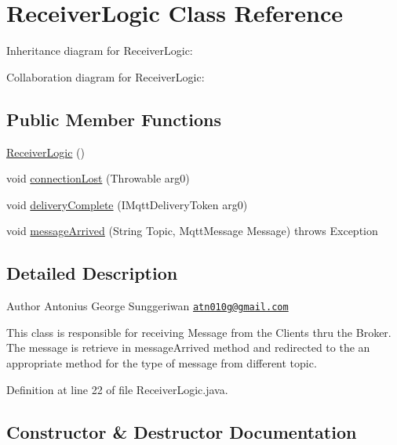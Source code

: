 \hypertarget{class_receiver_logic}{}\section{Receiver\+Logic Class Reference}
\label{class_receiver_logic}


Inheritance diagram for Receiver\+Logic\+:


Collaboration diagram for Receiver\+Logic\+:
\subsection*{Public Member Functions}
\begin{DoxyCompactItemize}
\item 
\hyperlink{class_receiver_logic_a63eb05bf9e4563a5d5b70b7754cf552a}{Receiver\+Logic} ()
\item 
void \hyperlink{class_receiver_logic_a10d83eeaf19038a5c41e2038b7dc450a}{connection\+Lost} (Throwable arg0)
\item 
void \hyperlink{class_receiver_logic_afbfe0394c17c18e33ed70e7ec8eeea84}{delivery\+Complete} (I\+Mqtt\+Delivery\+Token arg0)
\item 
void \hyperlink{class_receiver_logic_a2cfef54ab9bdcc6ddde72db5c7bdba97}{message\+Arrived} (String Topic, Mqtt\+Message Message)  throws Exception 
\end{DoxyCompactItemize}


\subsection{Detailed Description}
\begin{DoxyAuthor}{Author}
Antonius George Sunggeriwan \href{mailto:atn010g@gmail.com}{\tt atn010g@gmail.\+com}
\end{DoxyAuthor}
This class is responsible for receiving Message from the Clients thru the Broker. The message is retrieve in message\+Arrived method and redirected to the an appropriate method for the type of message from different topic. 

Definition at line 22 of file Receiver\+Logic.\+java.



\subsection{Constructor \& Destructor Documentation}
\mbox{\label{class_receiver_logic_a63eb05bf9e4563a5d5b70b7754cf552a}} 
